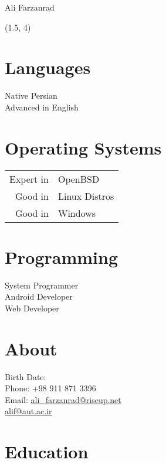 \documentclass[a4paper,10pt]{article}
\newcommand{\birthdate}{\DTMdate{1990-05-10}}
\begin{document}
{\Huge Ali Farzanrad}

\begin{textblock}{3.8}(1.5, 4)
	\raggedleft
	\section*{Languages}

	Native Persian \\
	Advanced in English

	\section*{Operating Systems}

	\begin{tabular}{rl}
		Expert in & OpenBSD \\
		Good in & Linux Distros \\
		Good in & Windows
	\end{tabular}

	\section*{Programming}

	System Programmer \\
	Android Developer \\
	Web Developer

\end{textblock}

\section*{{\color{blue}About}}

\begin{tabbing}
Birth Date: {\birthdate} \\
Phone: +98 911 871 3396 \\
Email:	\= \href{mailto:ali_farzanrad@riseup.net}{ali\_farzanrad@riseup.net} \\
	\> \href{mailto:alif@aut.ac.ir}{alif@aut.ac.ir}
\end{tabbing}

\section*{{\color{red}Education}}
\end{document}
